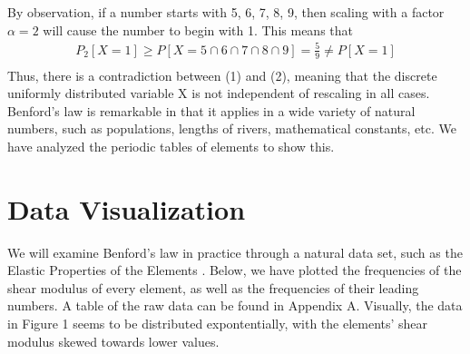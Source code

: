 \documentclass[12pt, titlepage]{article}
\begin{document}
By observation, if a number starts with 5, 6, 7, 8, 9, then scaling with a factor $\alpha = 2$ will cause the number to begin with 1. This means that
\begin{equation*}
\begin{split}
P_2[X = 1]  \geq P[X = 5 \cap 6 \cap 7 \cap 8 \cap 9] = \frac{5}{9} \neq P[X = 1]\\ 
\end{split}
\end{equation*}
Thus, there is a contradiction between (1) and (2), meaning that the discrete uniformly distributed variable X is not independent of rescaling in all cases. \\

Benford's law is remarkable in that it applies in a wide variety of natural numbers, such as populations, lengths of rivers, mathematical constants, etc. We have analyzed the periodic tables of elements to show this.

\section{Data Visualization}
We will examine Benford's law in practice through a natural data set, such as the Elastic Properties of the Elements \cite{elements}. Below, we have plotted the frequencies of the shear modulus of every element, as well as the frequencies of their leading numbers. A table of the raw data can be found in Appendix A.
Visually, the data in Figure 1 seems to be distributed expontentially, with the elements' shear modulus skewed towards lower values. \\
\end{document}
